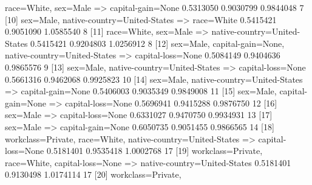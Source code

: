 \documentclass [a4paper] {article}
\begin{document}
{\begin{Schunk}
\begin{Soutput}
[9]  {race=White,                                                                                           
      sex=Male}                     => {capital-gain=None}            0.5313050  0.9030799 0.9844048       7
[10] {sex=Male,                                                                                             
      native-country=United-States} => {race=White}                   0.5415421  0.9051090 1.0585540       8
[11] {race=White,                                                                                           
      sex=Male}                     => {native-country=United-States} 0.5415421  0.9204803 1.0256912       8
[12] {sex=Male,                                                                                             
      capital-gain=None,                                                                                    
      native-country=United-States} => {capital-loss=None}            0.5084149  0.9404636 0.9865576       9
[13] {sex=Male,                                                                                             
      native-country=United-States} => {capital-loss=None}            0.5661316  0.9462068 0.9925823      10
[14] {sex=Male,                                                                                             
      native-country=United-States} => {capital-gain=None}            0.5406003  0.9035349 0.9849008      11
[15] {sex=Male,                                                                                             
      capital-gain=None}            => {capital-loss=None}            0.5696941  0.9415288 0.9876750      12
[16] {sex=Male}                     => {capital-loss=None}            0.6331027  0.9470750 0.9934931      13
[17] {sex=Male}                     => {capital-gain=None}            0.6050735  0.9051455 0.9866565      14
[18] {workclass=Private,                                                                                    
      race=White,                                                                                           
      native-country=United-States} => {capital-loss=None}            0.5181401  0.9535418 1.0002768      17
[19] {workclass=Private,                                                                                    
      race=White,                                                                                           
      capital-loss=None}            => {native-country=United-States} 0.5181401  0.9130498 1.0174114      17
[20] {workclass=Private,                                                                                    
}
\end{Soutput}
\end{Schunk}}
\end{document}
